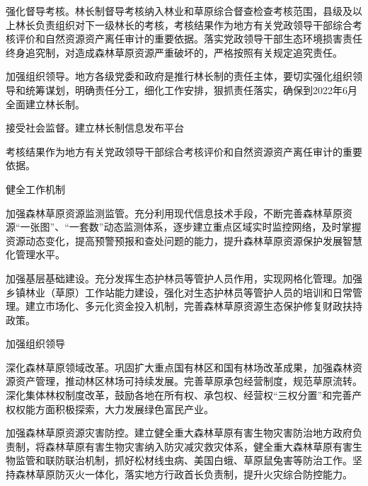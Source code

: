 强化督导考核。林长制督导考核纳入林业和草原综合督查检查考核范围，县级及以上林长负责组织对下一级林长的考核，考核结果作为地方有关党政领导干部综合考核评价和自然资源资产离任审计的重要依据。落实党政领导干部生态环境损害责任终身追究制，对造成森林草原资源严重破坏的，严格按照有关规定追究责任。

加强组织领导。地方各级党委和政府是推行林长制的责任主体，要切实强化组织领导和统筹谋划，明确责任分工，细化工作安排，狠抓责任落实，确保到2022年6月全面建立林长制。

\subtitle{2)}{接受社会监督。建立林长制信息发布平台}

考核结果作为地方有关党政领导干部综合考核评价和自然资源资产离任审计的重要依据。

\indent\subtitle{(1)}{健全工作机制}

加强森林草原资源监测监管。充分利用现代信息技术手段，不断完善森林草原资源“一张图”、“一套数”动态监测体系，逐步建立重点区域实时监控网络，及时掌握资源动态变化，提高预警预报和查处问题的能力，提升森林草原资源保护发展智慧化管理水平。

加强基层基础建设。充分发挥生态护林员等管护人员作用，实现网格化管理。加强乡镇林业（草原）工作站能力建设，强化对生态护林员等管护人员的培训和日常管理。建立市场化、多元化资金投入机制，完善森林草原资源生态保护修复财政扶持政策。

\indent\subtitle{(2)}{加强组织领导}

深化森林草原领域改革。巩固扩大重点国有林区和国有林场改革成果，加强森林资源资产管理，推动林区林场可持续发展。完善草原承包经营制度，规范草原流转。深化集体林权制度改革，鼓励各地在所有权、承包权、经营权“三权分置”和完善产权权能方面积极探索，大力发展绿色富民产业。

加强森林草原资源灾害防控。建立健全重大森林草原有害生物灾害防治地方政府负责制，将森林草原有害生物灾害纳入防灾减灾救灾体系，健全重大森林草原有害生物监管和联防联治机制，抓好松材线虫病、美国白蛾、草原鼠兔害等防治工作。坚持森林草原防灭火一体化，落实地方行政首长负责制，提升火灾综合防控能力。